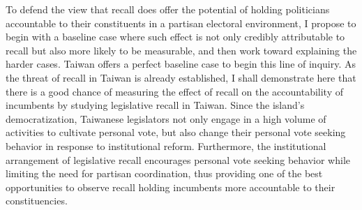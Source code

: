 \documentclass[hyphens, crop=false]{standalone}
\begin{document}
	
		To defend the view that recall does offer the potential of holding
		politicians accountable to their constituents in a partisan electoral environment,
		I propose to begin with a baseline case
		where such effect is not only credibly attributable to recall
		but also more likely to be measurable,
		and then work toward explaining the harder cases.
		Taiwan offers a perfect baseline case to begin this line of inquiry.
		As the threat of recall in Taiwan is already established,
		I shall demonstrate here that
		there is a good chance of measuring the effect of recall
		on the accountability of incumbents
		by studying
		legislative recall in Taiwan.
		Since the island's democratization,
		Taiwanese legislators not only engage in a high volume of activities
		to cultivate personal vote,
		but also change their personal vote seeking behavior
		in response to institutional reform.
		Furthermore,
		the institutional arrangement of legislative recall
		encourages personal vote seeking behavior
		while limiting the need for partisan coordination,
		thus providing one of the best opportunities to observe recall
		holding incumbents more accountable to their constituencies.
	
\end{document}
